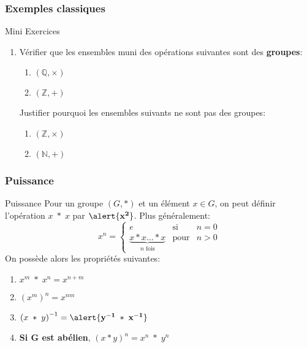 \documentclass{beamer}
\begin{document}
\begin{frame}[t]
  \frametitle{Exemples classiques}
 \begin{block}{Mini Exercices}
   \begin{enumerate}
     \item 
   Vérifier que les ensembles muni des opérations suivantes sont des
   \textbf{groupes}:

   \begin{enumerate}
     \item $\left(\mathbb{Q}, \times\right)$\\[6pt]
     \item $\left(\mathbb{Z}, +\right)$ \\[6pt]
   \end{enumerate}
  Justifier pourquoi les ensembles suivants ne sont pas des groupes:
  \begin{enumerate}
    \item $\left(\mathbb{Z}, \times\right)$\\[6pt]
    \item $\left(\mathbb{N}, +\right)$
  \end{enumerate}
   \end{enumerate}


 \end{block} 
\end{frame}


\begin{frame}[<+->]
  \frametitle{Puissance}
  \begin{block}{Puissance}
    Pour un groupe $\left(G,*\right)$ et un élément $x\in G$, on peut définir
    l'opération $ x\;*\; x$ par $\mathbf{\alert{x^2}}$. Plus généralement:
    \begin{equation}
      x^n  = \left\{
        \begin{array}{lll}
          e & \text{si}& n=0\\[6pt]
          \underbrace{x*x\ldots*x}_{n \text{ fois}}& \text{pour}& n>0
        \end{array}
      \right.
    \end{equation}
    On possède alors les propriétés suivantes:
    \begin{enumerate}
      \item $ x^m\;*\; x^n = x^{n+m}$\\[4pt]
      \item $ \left(x^m\right)^n = x^{nm}$\\[4pt]
      \item $\left(x\;*\;y\right)^{-1} = \mathbf{\alert{y^{-1}\;*\;
        x^{-1}}}$\\[4pt]
      \item \textbf{\alert{Si G est abélien}}, $(x*y)^n = x^n\;*\; y^n$
    \end{enumerate}
  \end{block}
\end{frame}
\end{document}
